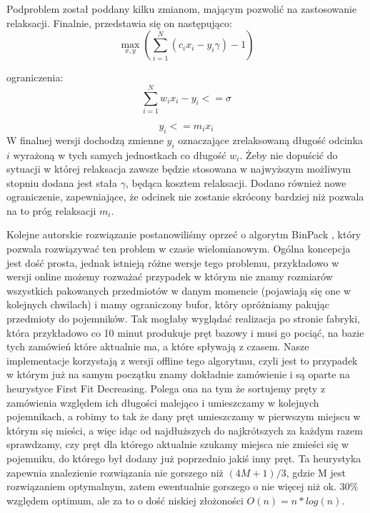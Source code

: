Podproblem został poddany kilku zmianom, mającym pozwolić na zastosowanie relaksacji. Finalnie, przedstawia się on następująco:
\begin{equation}
    \max_{x,y} (\sum_{i=1}^{N} (c_i x_i - y_i \gamma) - 1)
\end{equation}

ograniczenia:
\begin{equation}
    \sum_{i=1}^{N} w_i x_i - y_i <= \sigma
\label{ograniczenie1}
\end{equation}

\begin{equation}
    y_i <= m_i x_i
\label{ograniczenie2}
\end{equation}
W finalnej wersji dochodzą zmienne \(y_i\) oznaczające zrelaksowaną długość odcinka \(i\) wyrażoną w tych samych jednostkach co długość \(w_i\). Żeby nie dopuścić do sytuacji w której relaksacja zawsze będzie stosowana w najwyższym możliwym stopniu dodana jest stała \(\gamma\), będąca kosztem relaksacji. Dodano również nowe ograniczenie, zapewniające, że odcinek nie zostanie skrócony bardziej niż pozwala na to próg relaksacji \(m_i\).

Kolejne autorskie rozwiązanie postanowiliśmy oprzeć o algorytm BinPack \cite{bin-packing}, który pozwala rozwiązywać ten problem w czasie wielomianowym. Ogólna koncepcja jest dość prosta, jednak istnieją różne wersje tego problemu, przykładowo w wersji online możemy rozważać przypadek w którym nie znamy rozmiarów wszystkich pakowanych przedmiotów w danym momencie (pojawiają się one w kolejnych chwilach) i mamy ograniczony bufor, który opróżniamy pakując przedmioty do pojemników. Tak mogłaby wyglądać realizacja po stronie fabryki, która przykładowo co 10 minut produkuje pręt bazowy i musi go pociąć, na bazie tych zamówień które aktualnie ma, a które spływają z czasem. Nasze implementacje korzystają z wersji offline tego algorytmu, czyli jest to przypadek w którym już na samym początku znamy dokładnie zamówienie i są oparte na heurystyce First Fit Decreasing. Polega ona na tym że sortujemy pręty z zamówienia względem ich długości malejąco i umieszczamy w kolejnych pojemnikach, a robimy to tak że dany pręt umieszczamy w pierwszym miejscu w którym się mieści, a więc idąc od najdłuższych do najkrótszych za każdym razem sprawdzamy, czy pręt dla którego aktualnie szukamy miejsca nie zmieści się w pojemniku, do którego był dodany już poprzednio jakiś inny pręt. Ta heurystyka zapewnia znalezienie rozwiązania nie gorszego niż \((4M+1)/3\), gdzie M jest rozwiązaniem optymalnym, zatem ewentualnie gorszego o nie więcej niż ok. 30\% względem optimum, ale za to o dość niskiej złożoności $O(n) = n * log(n)$.

